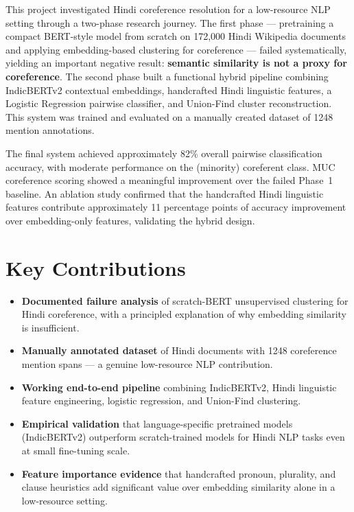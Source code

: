 \documentclass[12pt,a4paper]{report}
\begin{document}
This project investigated Hindi coreference resolution for a low-resource NLP setting through a two-phase research journey. The first phase --- pretraining a compact BERT-style model from scratch on 172,000 Hindi Wikipedia documents and applying embedding-based clustering for coreference --- failed systematically, yielding an important negative result: \textbf{semantic similarity is not a proxy for coreference}. The second phase built a functional hybrid pipeline combining IndicBERTv2 contextual embeddings, handcrafted Hindi linguistic features, a Logistic Regression pairwise classifier, and Union-Find cluster reconstruction. This system was trained and evaluated on a manually created dataset of 1248 mention annotations.

The final system achieved approximately 82\% overall pairwise classification accuracy, with moderate performance on the (minority) coreferent class. MUC coreference scoring showed a meaningful improvement over the failed Phase~1 baseline. An ablation study confirmed that the handcrafted Hindi linguistic features contribute approximately 11 percentage points of accuracy improvement over embedding-only features, validating the hybrid design.

\section{Key Contributions}

\begin{itemize}
    \item \textbf{Documented failure analysis} of scratch-BERT unsupervised clustering for Hindi coreference, with a principled explanation of why embedding similarity is insufficient.
    \item \textbf{Manually annotated dataset} of Hindi documents with 1248 coreference mention spans --- a genuine low-resource NLP contribution.
    \item \textbf{Working end-to-end pipeline} combining IndicBERTv2, Hindi linguistic feature engineering, logistic regression, and Union-Find clustering.
    \item \textbf{Empirical validation} that language-specific pretrained models (IndicBERTv2) outperform scratch-trained models for Hindi NLP tasks even at small fine-tuning scale.
    \item \textbf{Feature importance evidence} that handcrafted pronoun, plurality, and clause heuristics add significant value over embedding similarity alone in a low-resource setting.
\end{itemize}
\end{document}
